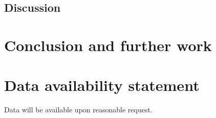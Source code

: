 \documentclass[smallcondensed]{svjour3}     %
\begin{document}
\subsection{Discussion}

\section{Conclusion and further work}\label{section: conclusions}

\begin{acknowledgements}

\end{acknowledgements}

\section*{Data availability statement}
Data will be available upon reasonable request.




\end{document}
